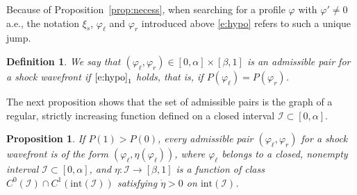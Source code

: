 \documentclass[11pt,a4paper]{article}
\newtheorem{proposition}{Proposition}[section]
\newtheorem{definition}{Definition}[section]
\renewcommand{\phi}{\varphi}
\begin{document}
Because of Proposition~\ref{prop:necess}, when searching for a profile $\phi$ with $\phi'\ne0$ a.e., the notation $\xi_s$, $\phi_\ell$ and $\phi_r$ introduced above \eqref{e:hypo} refers to such a unique jump. 

\begin{definition}\label{d:admissible} We say that $(\varphi_\ell, \varphi_r) \in [0,\alpha] \times [\beta,1]$ is an \emph{admissible pair for a shock wavefront} if $\eqref{e:hypo}_1$ holds, that is, if $P(\varphi_\ell) = P(\varphi_r)$.  
\end{definition}
The next proposition shows that the set of admissible pairs is the graph of a regular, strictly increasing function defined on a closed interval $\mathcal I \subset [0,\alpha]$.

\begin{proposition}
\label{prop:necess2}
If $P(1)>P(0)$, every admissible pair $(\varphi_\ell,\varphi_r)$ for a shock wavefront is of the form $\left(\varphi_\ell, \eta(\varphi_\ell)\right)$, where $\varphi_\ell$ belongs to a closed, nonempty interval $\mathcal I \subset [0,\alpha]$, and $\eta: \mathcal I \to [\beta,1]$ is a function of class $C^0(\mathcal I) \cap C^1\left(\mathrm{int}(\mathcal I)\right)$ satisfying $\dot{\eta} > 0$ on $\mathrm{int}(\mathcal I)$.
\end{proposition}
\end{document}
